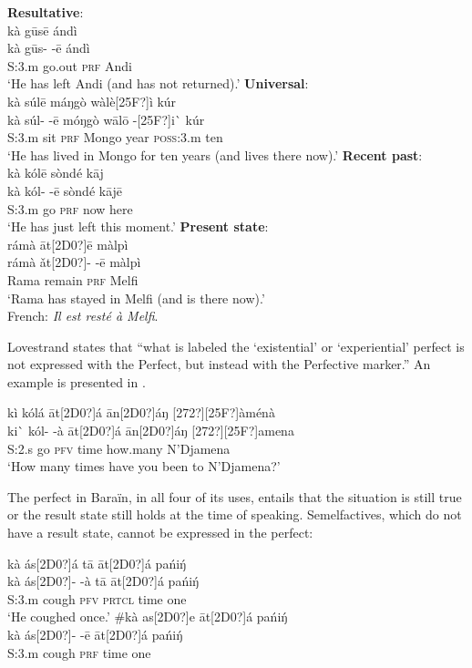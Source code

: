 \ea
\ea  \textbf{Resultative}:\\
\glll kà  gūsē    ándì\\
kà  gūs-  -ē  ándì\\
S:3.m  go.out  \textsc{prf}  Andi\\
\glt ‘He has left Andi (and has not returned).’
\ex   \textbf{Universal}:\\
\glll kà  súlē    máŋgò  wàlè[25F?]ì    kúr\\
kà  súl-  -ē  móŋgò  wālō  -[25F?]i\`{}   kúr\\
S:3.m  sit  \textsc{prf}  Mongo  year  \textsc{poss}:3.m  ten\\
\glt ‘He has lived in Mongo for ten years (and lives there now).’
\ex   \textbf{Recent past}:\\
\glll kà  kólē    sòndé  kāj\\
kà  kól-  -ē  sòndé  kājē\\
S:3.m  go  \textsc{prf}  now  here\\
\glt ‘He has just left this moment.’
\ex   \textbf{Present state}:\\
\glll rámà  āt[2D0?]ē    màlpì\\
rámà  ǎt[2D0?]-  -ē  màlpì\\
Rama  remain  \textsc{prf}  Melfi\\
\glt ‘Rama has stayed in Melfi (and is there now).’\\
French: \textit{Il est resté à Melfi}.
\z \z


Lovestrand states that “what is labeled the ‘existential’ or ‘experiential’ perfect is not expressed with the Perfect, but instead with the Perfective marker.” An example is presented in .


\ea
\glll kì  kólá    āt[2D0?]á  ān[2D0?]áŋ  [272?][25F?]àménà\\
ki\`{}   kól-  -à  āt[2D0?]á  ān[2D0?]áŋ  [272?][25F?]amena\\
S:2.s  go  \textsc{pfv}  time  how.many  N’Djamena\\
\glt ‘How many times have you been to N’Djamena?’
\z


The perfect in Baraïn, in all four of its uses, entails that the situation is still true or the result state still holds at the time of speaking. Semelfactives, which do not have a result state, cannot be expressed in the perfect:


\ea
\ea \glll  kà  ás[2D0?]á    tā  āt[2D0?]á  pańi\'{ŋ}\\
kà  ás[2D0?]-  -à  tā  āt[2D0?]á  pańi\'{ŋ}\\
S:3.m  cough  \textsc{pfv}  \textsc{prtcl}  time  one\\
\glt ‘He coughed once.’
\ex \glll  \#kà  as[2D0?]e    āt[2D0?]á  pańi\'{ŋ}\\
  kà  ás[2D0?]-  -ē  āt[2D0?]á  pańi\'{ŋ}\\
S:3.m  cough  \textsc{prf}  time  one\\
\z \z


